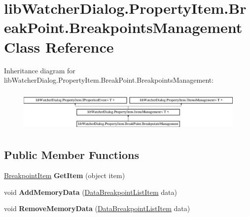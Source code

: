 \hypertarget{classlib_watcher_dialog_1_1_property_item_1_1_break_point_1_1_breakpoints_management}{\section{lib\+Watcher\+Dialog.\+Property\+Item.\+Break\+Point.\+Breakpoints\+Management Class Reference}
\label{classlib_watcher_dialog_1_1_property_item_1_1_break_point_1_1_breakpoints_management}
}
Inheritance diagram for lib\+Watcher\+Dialog.\+Property\+Item.\+Break\+Point.\+Breakpoints\+Management\+:\begin{figure}[H]
\begin{center}
\leavevmode
\includegraphics[height=2.110553cm]{classlib_watcher_dialog_1_1_property_item_1_1_break_point_1_1_breakpoints_management}
\end{center}
\end{figure}
\subsection*{Public Member Functions}
\begin{DoxyCompactItemize}
\item 
\hypertarget{classlib_watcher_dialog_1_1_property_item_1_1_break_point_1_1_breakpoints_management_a6a96f9664cff1038a87e6ff5d499f6b4}{\hyperlink{classlib_watcher_dialog_1_1_property_item_1_1_break_point_1_1_breakpoint_item}{Breakpoint\+Item} {\bfseries Get\+Item} (object item)}\label{classlib_watcher_dialog_1_1_property_item_1_1_break_point_1_1_breakpoints_management_a6a96f9664cff1038a87e6ff5d499f6b4}

\item 
\hypertarget{classlib_watcher_dialog_1_1_property_item_1_1_break_point_1_1_breakpoints_management_af1fb8574b2785ddab7f4275e29f0c9d9}{void {\bfseries Add\+Memory\+Data} (\hyperlink{classlib_watcher_dialog_1_1_list_1_1_data_breakpoint_list_item}{Data\+Breakpoint\+List\+Item} data)}\label{classlib_watcher_dialog_1_1_property_item_1_1_break_point_1_1_breakpoints_management_af1fb8574b2785ddab7f4275e29f0c9d9}

\item 
\hypertarget{classlib_watcher_dialog_1_1_property_item_1_1_break_point_1_1_breakpoints_management_a6479a46ffb62db3cf95cc2c76b1c7654}{void {\bfseries Remove\+Memory\+Data} (\hyperlink{classlib_watcher_dialog_1_1_list_1_1_data_breakpoint_list_item}{Data\+Breakpoint\+List\+Item} data)}\label{classlib_watcher_dialog_1_1_property_item_1_1_break_point_1_1_breakpoints_management_a6479a46ffb62db3cf95cc2c76b1c7654}

\end{DoxyCompactItemize}
